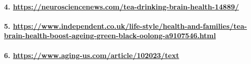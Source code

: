 \documentclass[]{article}
\let\oldparagraph\paragraph
\renewcommand{\paragraph}[1]{\oldparagraph{#1}\mbox{}}
\begin{document}
\hypertarget{httpsneurosciencenews.comtea-drinking-brain-health-14889}{%
\paragraph{\texorpdfstring{4.
\url{https://neurosciencenews.com/tea-drinking-brain-health-14889/}}{4. https://neurosciencenews.com/tea-drinking-brain-health-14889/}}\label{httpsneurosciencenews.comtea-drinking-brain-health-14889}}

\hypertarget{httpswww.independent.co.uklife-stylehealth-and-familiestea-brain-health-boost-ageing-green-black-oolong-a9107546.html}{%
\paragraph{\texorpdfstring{5.
\url{https://www.independent.co.uk/life-style/health-and-families/tea-brain-health-boost-ageing-green-black-oolong-a9107546.html}}{5. https://www.independent.co.uk/life-style/health-and-families/tea-brain-health-boost-ageing-green-black-oolong-a9107546.html}}\label{httpswww.independent.co.uklife-stylehealth-and-familiestea-brain-health-boost-ageing-green-black-oolong-a9107546.html}}

\hypertarget{httpswww.aging-us.comarticle102023text}{%
\paragraph{\texorpdfstring{6.
\url{https://www.aging-us.com/article/102023/text}}{6. https://www.aging-us.com/article/102023/text}}\label{httpswww.aging-us.comarticle102023text}}
\end{document}
